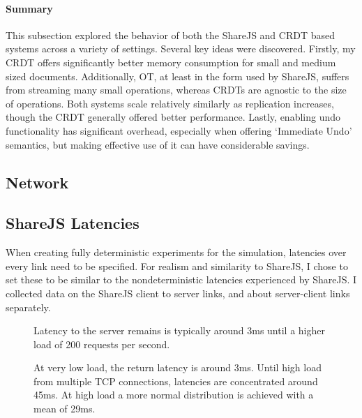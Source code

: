 \documentclass[12pt,a4paper,twoside,openright]{report}
\begin{document}
			\paragraph{Summary}
				This subsection explored the behavior of both the ShareJS and CRDT based systems across a variety of settings. Several key ideas were discovered. Firstly, my CRDT offers significantly better memory consumption for small and medium sized documents. Additionally, OT, at least in the form used by ShareJS, suffers from streaming many small operations, whereas CRDTs are agnostic to the size of operations. Both systems scale relatively similarly as replication increases, though the CRDT generally offered better performance. Lastly, enabling undo functionality has significant overhead, especially when offering `Immediate Undo' semantics, but making effective use of it can have considerable savings.
					
		\subsection{Network}
			
		
			\subsection{ShareJS Latencies}
			When creating fully deterministic experiments for the simulation, latencies over every link need to be specified. For realism and similarity to ShareJS, I chose to set these to be similar to the nondeterministic latencies experienced by ShareJS. I collected data on the ShareJS client to server links, and about server-client links separately.			
			
			\begin{figure}[h]
				\centering
					
				\caption[Client-Server Latency] {Latency to the server remains is typically around 3ms until a higher load of 200 requests per second.}
			\end{figure}
			\begin{figure}[h]
				\centering
					
				\caption[Server-Client Latencies] {At very low load, the return latency is around 3ms. Until high load from multiple TCP connections, latencies are concentrated around 45ms. At high load a more normal distribution is achieved with a mean of 29ms.}
			\end{figure}
			
\end{document}
